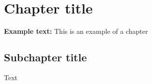 \documentclass[../main.tex]{subfiles}
\begin{document}
    \section{Chapter title}
    \textbf{Example text:}
    This is an example of a chapter

    \subsection{Subchapter title}
    Text
    \pagebreak
\end{document}
